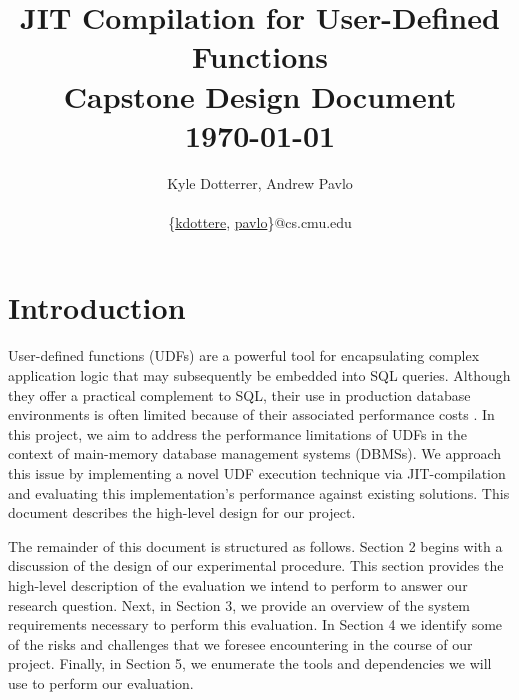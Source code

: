 \documentclass{vldb}
\newcommand{\paperTitle}{JIT Compilation for User-Defined Functions\\ 
    \large Capstone Design Document\\
    \today}
\begin{document}
\title{\paperTitle}

\author{
    \alignauthor Kyle Dotterrer, Andrew Pavlo\\
    \\
    \email 
        \{\href{mailto:kdottere@cs.cmu.edu}{kdottere},
        \href{mailto:pavlo@cs.cmu.edu}{pavlo}\}@cs.cmu.edu\\
}

\makeatletter
\def\@copyrightspace{\relax}
\makeatother

\maketitle


\section{Introduction}


User-defined functions (UDFs) are a powerful tool for encapsulating complex application logic that may subsequently be embedded into SQL queries. Although they offer a practical complement to SQL, their use in production database environments is often limited because of their associated performance costs \cite{froid, apfel}. In this project, we aim to address the performance limitations of UDFs in the context of main-memory database management systems (DBMSs). We approach this issue by implementing a novel UDF execution technique via JIT-compilation and evaluating this implementation's performance against existing solutions. This document describes the high-level design for our project. 

The remainder of this document is structured as follows. Section 2 begins with a discussion of the design of our experimental procedure. This section provides the high-level description of the evaluation we intend to perform to answer our research question. Next, in Section 3, we provide an overview of the system requirements necessary to perform this evaluation. In Section 4 we identify some of the risks and challenges that we foresee encountering in the course of our project. Finally, in Section 5, we enumerate the tools and dependencies we will use to perform our evaluation.
\end{document}
